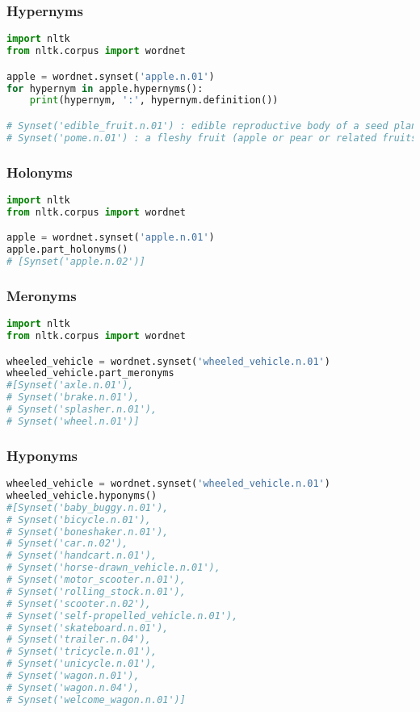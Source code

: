 \subsubsection{Hypernyms}
\begin{lstlisting}[language=Python]
import nltk
from nltk.corpus import wordnet

apple = wordnet.synset('apple.n.01')
for hypernym in apple.hypernyms():
    print(hypernym, ':', hypernym.definition())

# Synset('edible_fruit.n.01') : edible reproductive body of a seed plant especially one having sweet flesh
# Synset('pome.n.01') : a fleshy fruit (apple or pear or related fruits) having seed chambers and an outer fleshy part
\end{lstlisting}

\subsubsection{Holonyms}
\begin{lstlisting}[language=Python]
import nltk
from nltk.corpus import wordnet

apple = wordnet.synset('apple.n.01')
apple.part_holonyms()
# [Synset('apple.n.02')]
\end{lstlisting}

\subsubsection{Meronyms}
\begin{lstlisting}[language=Python]
import nltk
from nltk.corpus import wordnet

wheeled_vehicle = wordnet.synset('wheeled_vehicle.n.01')
wheeled_vehicle.part_meronyms
#[Synset('axle.n.01'),
# Synset('brake.n.01'),
# Synset('splasher.n.01'),
# Synset('wheel.n.01')]
\end{lstlisting}

\subsubsection{Hyponyms}
\begin{lstlisting}[language=Python]
wheeled_vehicle = wordnet.synset('wheeled_vehicle.n.01')
wheeled_vehicle.hyponyms()
#[Synset('baby_buggy.n.01'),
# Synset('bicycle.n.01'),
# Synset('boneshaker.n.01'),
# Synset('car.n.02'),
# Synset('handcart.n.01'),
# Synset('horse-drawn_vehicle.n.01'),
# Synset('motor_scooter.n.01'),
# Synset('rolling_stock.n.01'),
# Synset('scooter.n.02'),
# Synset('self-propelled_vehicle.n.01'),
# Synset('skateboard.n.01'),
# Synset('trailer.n.04'),
# Synset('tricycle.n.01'),
# Synset('unicycle.n.01'),
# Synset('wagon.n.01'),
# Synset('wagon.n.04'),
# Synset('welcome_wagon.n.01')]
\end{lstlisting}

\newpage